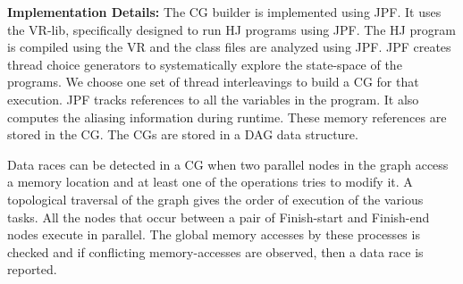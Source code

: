 \textbf{Implementation Details:}
The CG builder is implemented using JPF. It uses the VR-lib, specifically designed to run HJ programs using JPF. The HJ program is compiled using the VR and the class files are analyzed using JPF. JPF creates thread choice generators to systematically explore the state-space of the programs. We choose one set of thread interleavings to build a CG for that execution. JPF tracks references to all the variables in the program. It also computes the aliasing information during runtime. These memory references are stored in the CG. The CGs are stored in a DAG data structure. 

Data races can be detected in a CG when two parallel nodes in the graph access a memory location and at least one of the operations tries to modify it. A topological traversal of the graph gives the order of execution of the various tasks. All the nodes that occur between a pair of Finish-start and Finish-end nodes execute in parallel. The global memory accesses by these processes is checked and if conflicting memory-accesses are observed, then a data race is reported.